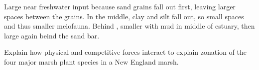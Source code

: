 \documentclass[11pt, addpoints]{exam}
\newcommand*\AnswerBox[2]{%
    \parbox[t][#1]{0.92\textwidth}{%
    \begin{solution}#2\end{solution}}
    \vspace{\stretch{1}}
}
\newlength{\basespace}
\begin{document}
\begin{questions}
{\AnswerBox{\basespace}{Large near freshwater input because sand grains fall out first, leaving larger spaces between the grains. In the middle, clay and silt fall out, so small spaces and thus smaller meiofauna. Behind , smaller with mud in middle of estuary, then large again beind the sand bar.}

\newpage

%


\question[15]
Explain how physical and competitive forces interact to explain zonation of the four major marsh plant species in a New England marsh.


} %
\end{questions}
\end{document}
